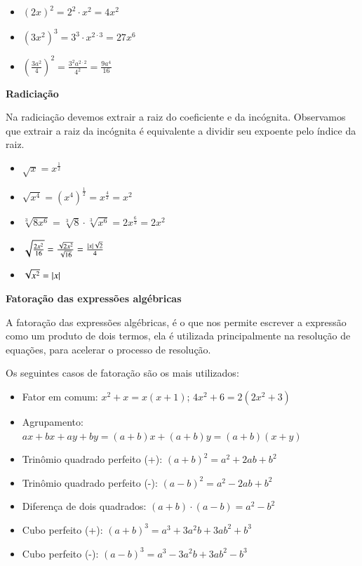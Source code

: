     \begin{itemize}
     \item $(2x)^2= 2^2 \cdot x^2= 4x^2$
     \item $(3x^2)^3= 3^3 \cdot x^{2\cdot 3}= 27x^6$
     \item $\left(\frac{3a^2}{4}\right)^2= \frac{3^2 a^{2 \cdot 2}}{4^2}= \frac{9a^4}{16}$
    \end{itemize}

  \vskip0.3cm

  \textbf{Radiciação}

  Na radiciação devemos extrair a raiz do coeficiente e da incógnita. Observamos que extrair a raiz da incógnita é equivalente a dividir seu expoente pelo índice da raiz.
    \begin{itemize}
     \item $\sqrt{x}= x^{\frac{1}{2}}$
     \item $\sqrt{x^4}= (x^4)^{\frac{1}{2}}= x^{\frac{4}{2}}= x^2$
     \item $\sqrt[3]{8x^6}= \sqrt[3]{8} \cdot \sqrt[3]{x^6}= 2 x^{\frac{6}{3}}= 2x^2$
     \item $\sqrt{\frac{2x^2}{16}}= \frac{\sqrt{2x^2}}{\sqrt{16}}= \frac{\left|x\right|\sqrt{2}}{4}$
     \item $\sqrt{x^2}= \left|x\right|$
    \end{itemize}

 \vskip0.3cm

  \textbf{Fatoração das expressões algébricas}

 \vskip0.3cm

 A fatoração das expressões algébricas, é o que nos permite escrever a expressão como um produto de dois termos, ela é utilizada principalmente na resolução de equações, para acelerar o processo de resolução.

 Os seguintes casos de fatoração são os mais utilizados:
 \begin{itemize}
  \item Fator em comum: $x^2 + x= x(x + 1)$; $4x^2 + 6= 2(2x^2 + 3)$
  \item Agrupamento: $ax + bx + ay + by= (a+b)x+(a+b)y= (a+b)(x+y)$
  \item Trinômio quadrado perfeito (+): $(a + b)^2= a^2 + 2ab + b^2$
  \item Trinômio quadrado perfeito (-): $(a - b)^2= a^2 - 2ab + b^2$
  \item Diferença de dois quadrados: $(a + b) \cdot (a - b)= a^2 - b^2$
  \item Cubo perfeito (+): $(a+b)^3= a^3 + 3a^2b + 3ab^2 + b^3$
  \item Cubo perfeito (-): $(a-b)^3= a^3 - 3a^2b + 3ab^2 - b^3$
 \end{itemize}

